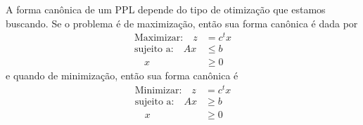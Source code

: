 A forma canônica de um PPL depende do tipo de otimização que estamos buscando. Se o problema é de maximização, então sua forma canônica é dada por
\begin{align*}
\text{Maximizar:} \quad z & = c^t x \\
\text{sujeito a:} \quad Ax & \leq b \\
				  \quad x & \geq 0
\end{align*}
e quando de minimização, então sua forma canônica é
\begin{align*}
	\text{Minimizar:} \quad z & = c^t x \\
	\text{sujeito a:} \quad Ax  & \geq b \\
	\quad  x  & \geq 0
\end{align*}
